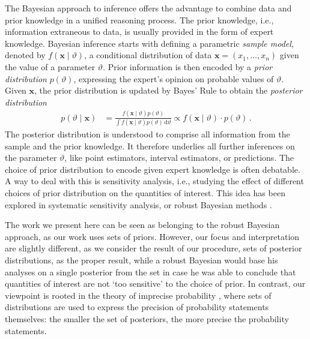 \documentclass[runningheads,a4paper]{llncs}
\newcommand{\dd}{\,\mathrm{d}}
\renewcommand{\vec}[1]{{\bm #1}}
\begin{document}
The Bayesian approach to inference \cite{2007:robert,2005:ruggeri} %
offers the advantage to combine data and prior knowledge in a unified reasoning process.
The prior knowledge, i.e., information extraneous to data, is usually provided in the form of expert knowledge.
%
Bayesian inference starts with defining a parametric \emph{sample model},
denoted by $f(\vec{x} \mid \vartheta)$,
a conditional distribution of data $\vec{x} = (x_1, \ldots, x_n)$ given the value of a parameter $\vartheta$.
Prior information is then encoded by a \emph{prior distribution} $p(\vartheta)$,
expressing the expert's opinion on probable values of $\vartheta$.
Given $\vec{x}$, the prior distribution is updated by Bayes' Rule
to obtain the \emph{posterior distribution}
\begin{align}
\label{eq:bayesrule}
p(\vartheta\mid\vec{x}) &= \frac{f(\vec{x}\mid\vartheta) p(\vartheta)}{\int f(\vec{x}\mid\vartheta) p(\vartheta) \dd \vartheta}
                         \propto f(\vec{x}\mid\vartheta) \cdot p(\vartheta)\,.
\end{align}
The posterior distribution is understood to comprise all information from the sample and the prior knowledge.
It therefore underlies all further inferences on the parameter $\vartheta$,
like point estimators, interval estimators,
or predictions.
%
The choice of prior distribution to encode given expert knowledge is often debatable.
A way to deal with this is sensitivity analysis,
i.e., studying the effect of different choices of prior distribution on the quantities of interest.
This idea has been explored in systematic sensitivity analysis, or robust Bayesian methods
\cite{1994:berger,2000:rios}. %

The work we present here can be seen as belonging to the robust Bayesian approach, as our work uses sets of priors.
However, our focus and interpretation are slightly different,
as we consider the result of our procedure, sets of posterior distributions, as the proper result,
while a robust Bayesian would base his analyses on a single posterior from the set
in case he was able to conclude that quantities of interest are not `too sensitive' to the choice of prior.
In contrast, our viewpoint is rooted in the theory of imprecise probability \cite{itip,1991:walley},
where sets of distributions are used to express the precision of probability statements themselves:
the smaller the set of posteriors, the more precise the probability statements.
\end{document}
